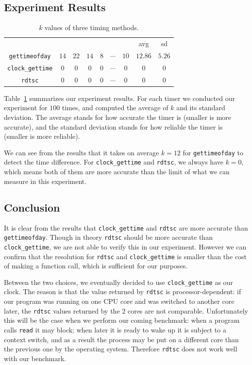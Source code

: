 \documentclass[11pt,conference]{IEEEtran}
\begin{document}
\subsection{Experiment Results}
\begin{table}
    \centering
    \begin{tabular}{ccccccccc}
        {} & {} & {} & {} & {} & {} & {} & avg & sd \\
        \texttt{gettimeofday} & $14$ & $22$ & $14$ & $8$ & $\cdots$ & $10$ & $12.86$ & $5.26$ \\
        \texttt{clock\_gettime} & $0$ & $0$ & $0$ & $0$ & $\cdots$ & $0$ & $0$ & $0$ \\
        \texttt{rdtsc} & $0$ & $0$ & $0$ & $0$ & $\cdots$ & $0$ & $0$ & $0$ \\
    \end{tabular}
    \caption{$k$ values of three timing methods.}
    \label{tab:1}
\end{table}
Table~\ref{tab:1} summarizes our experiment results.
For each timer we conducted our experiment for $100$ times, and computed the average of $k$ and its standard deviation.
The average stands for how accurate the timer is (smaller is more accurate), and the standard deviation stands for how reliable the timer is (smaller is more reliable).

We can see from the results that it takes on average $k=12$ for \texttt{gettimeofday} to detect the time difference.
For \texttt{clock\_gettime} and \texttt{rdtsc}, we always have $k=0$, which means both of them are more accurate than the limit of what we can measure in this experiment.

\subsection{Conclusion}
It is clear from the results that \texttt{clock\_gettime} and \texttt{rdtsc} are more accurate than \texttt{gettimeofday}.
Though in theory \texttt{rdtsc} should be more accurate than \texttt{clock\_gettime}, we are not able to verify this in our experiment.
However we can confirm that the resolution for \texttt{rdtsc} and \texttt{clock\_gettime} is smaller than the cost of making a function call, which is sufficient for our purposes.

Between the two choices, we eventually decided to use \texttt{clock\_gettime} as our clock.
The reason is that the value returned by \texttt{rdtsc} is processor-dependent: if our program was running on one CPU core and was switched to another core later, the \texttt{rdtsc} values returned by the $2$ cores are not comparable.
Unfortunately this will be the case when we perform our coming benchmark: when a program calls \texttt{read} it may block; when later it is ready to wake up it is subject to a context switch, and as a result the process may be put on a different core than the previous one by the operating system.
Therefore \texttt{rdtsc} does not work well with our benchmark.
\end{document}
